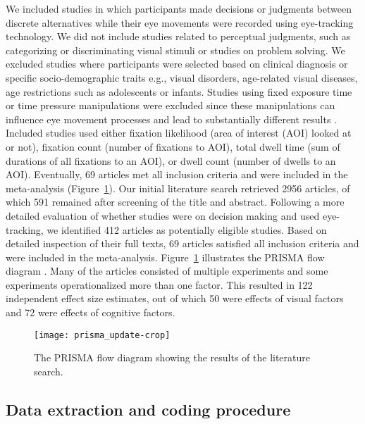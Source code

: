 We included studies in which participants made decisions or judgments between discrete alternatives while their eye movements were recorded using eye-tracking technology. We did not include studies related to perceptual judgments, such as categorizing or discriminating visual stimuli or studies on problem solving. We excluded studies where participants were selected based on clinical diagnosis or specific socio-demographic traits e.g., visual disorders, age-related visual diseases, age restrictions such as adolescents or infants. Studies using fixed exposure time or time pressure manipulations were excluded since these manipulations can influence eye movement processes \citep{orquin2018a} and lead to substantially different results \citep{simola2019a}. Included studies used either fixation likelihood (area of interest (AOI) looked at or not), fixation count (number of fixations to AOI), total dwell time (sum of durations of all fixations to an AOI), or dwell count (number of dwells to an AOI). Eventually, 69 articles met all inclusion criteria and were included in the meta-analysis (Figure~\ref{fig:flow_diagram}). Our initial literature search retrieved 2956 articles, of which 591 remained after screening of the title and abstract. Following a more detailed evaluation of whether studies were on decision making and used eye-tracking, we identified 412 articles as potentially eligible studies. Based on detailed inspection of their full texts, 69 articles satisfied all inclusion criteria and were included in the meta-analysis. Figure~\ref{fig:flow_diagram} illustrates the PRISMA flow diagram \citep{moher2009preferred}. Many of the articles consisted of multiple experiments and some experiments operationalized more than one factor. This resulted in 122 independent effect size estimates, out of which 50 were effects of visual factors and 72 were effects of cognitive factors.


\begin{figure}[H]
\texttt{[image: prisma\_update-crop]}
\centering
\caption{The PRISMA flow diagram showing the results of the literature search.}
\label{fig:flow_diagram}
\end{figure}


\subsection{Data extraction and coding procedure}

